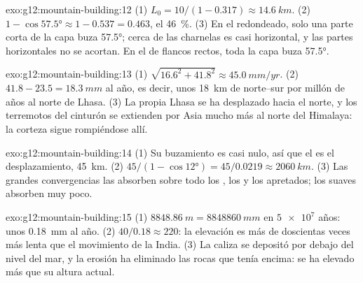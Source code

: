 \begin{solution}{exo:g12:mountain-building:12}
(1) $L_0 = 10/(1 - 0.317) \approx \qty{14.6}{km}$. (2) $1 - \cos\ang{57.5}
\approx 1 - 0.537 = 0.463$, el \qty{46}{\percent}. (3) En el 
redondeado, solo una parte corta de la capa buza \ang{57.5}; cerca de las
charnelas es casi horizontal, y las partes horizontales no se acortan. En el
 de flancos rectos, toda la capa buza \ang{57.5}.
\end{solution}

\begin{solution}{exo:g12:mountain-building:13}
(1) $\sqrt{16.6^2 + 41.8^2} \approx \qty{45.0}{mm/yr}$. (2) $41.8 - 23.5 =
\qty{18.3}{mm}$ al año, es decir, unos \qty{18}{km} de 
norte--sur por millón de años al norte de Lhasa. (3) La propia Lhasa se ha
desplazado hacia el norte, y los terremotos del cinturón se extienden por Asia
mucho más al norte del Himalaya: la corteza sigue rompiéndose allí.
\end{solution}

\begin{solution}{exo:g12:mountain-building:14}
(1) Su buzamiento es casi nulo, así que el  es el desplazamiento,
\qty{45}{km}. (2) $45/(1 - \cos\ang{12}) = 45/0.0219 \approx \qty{2060}{km}$.
(3) Las grandes convergencias las absorben sobre todo los , los
 y los  apretados; los  suaves absorben
muy poco.
\end{solution}

\begin{solution}{exo:g12:mountain-building:15}
(1) $\qty{8848.86}{m} = \qty{8848860}{mm}$ en $\num{5e7}$ años: unos
\qty{0.18}{mm} al año. (2) $40/0.18 \approx 220$: la elevación es más de
doscientas veces más lenta que el movimiento de la India. (3) La caliza se
depositó por debajo del nivel del mar, y la erosión ha eliminado las rocas que
tenía encima: se ha elevado más que su altura actual.
\end{solution}

